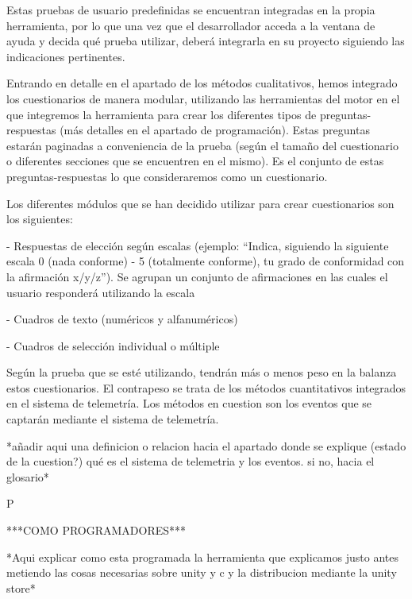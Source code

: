 Estas pruebas de usuario predefinidas se encuentran integradas en la propia herramienta, por lo que una vez que el desarrollador acceda a la ventana de ayuda y decida qué prueba utilizar, deberá integrarla en su proyecto siguiendo las indicaciones pertinentes. 


Entrando en detalle en el apartado de los métodos cualitativos, hemos integrado los cuestionarios de manera modular, utilizando las herramientas del motor en el que integremos la herramienta para crear los diferentes tipos de preguntas-respuestas (más detalles en el apartado de programación). Estas preguntas estarán paginadas a conveniencia de la prueba (según el tamaño del cuestionario o diferentes secciones que se encuentren en el mismo). Es el conjunto de estas preguntas-respuestas lo que consideraremos como un cuestionario.


Los diferentes módulos que se han decidido utilizar para crear cuestionarios son los siguientes:


- Respuestas de elección según escalas (ejemplo: “Indica, siguiendo la siguiente escala 0 (nada conforme) - 5 (totalmente conforme), tu grado de conformidad con la afirmación x/y/z”). Se agrupan un conjunto de afirmaciones en las cuales el usuario responderá utilizando la escala

- Cuadros de texto (numéricos y alfanuméricos)

- Cuadros de selección individual o múltiple


Según la prueba que se esté utilizando, tendrán más o menos peso en la balanza estos cuestionarios. El contrapeso se trata de los métodos cuantitativos integrados en el sistema de telemetría. Los métodos en cuestion son los eventos que se captarán mediante el sistema de telemetría.


*añadir aqui una definicion o relacion hacia el apartado donde se explique (estado de la cuestion?) qué es el sistema de telemetria y los eventos. si no, hacia el glosario*


P


***COMO PROGRAMADORES***


*Aqui explicar como esta programada la herramienta que explicamos justo antes metiendo las cosas necesarias sobre unity y c y la distribucion mediante la unity store*



